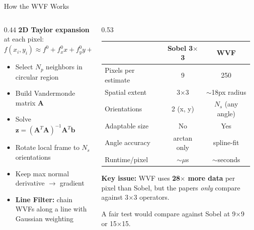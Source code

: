 \documentclass[10pt, aspectratio=169]{beamer}
\begin{document}
\begin{frame}{How the WVF Works}
  \begin{columns}[T]
    \begin{column}{0.44\textwidth}
      \textbf{2D Taylor expansion} at each pixel:
      \vspace{-0.3em}
      \begin{equation*}
        f(x_i, y_i) \approx f^0 + f_x^0 x + f_y^0 y + \tfrac{f_{xx}^0}{2} x^2 + \cdots
      \end{equation*}
      \vspace{-0.5em}
      \begin{itemize}
        \item Select $N_p$ neighbors in circular region
        \item Build Vandermonde matrix $\mathbf{A}$
        \item Solve $\mathbf{z} = (\mathbf{A}^T\mathbf{A})^{-1}\mathbf{A}^T\mathbf{b}$
        \item Rotate local frame to $N_s$ orientations
        \item Keep max normal derivative $\rightarrow$ gradient
        \item \textbf{Line Filter:} chain WVFs along a line with Gaussian weighting
      \end{itemize}
    \end{column}
    \begin{column}{0.53\textwidth}
      \vspace{0.5em}
      \begin{tabular}{lcc}
        \toprule
        & \textbf{Sobel 3$\times$3} & \textbf{WVF} \\
        \midrule
        Pixels per estimate & 9 & 250 \\
        Spatial extent & 3$\times$3 & $\sim$18px radius \\
        Orientations & 2 (x, y) & $N_s$ (any angle) \\
        Adaptable size & No & Yes \\
        Angle accuracy & arctan only & spline-fit \\
        Runtime/pixel & $\sim$$\mu$s & $\sim$seconds \\
        \bottomrule
      \end{tabular}
      \vspace{0.5em}

      \textbf{Key issue:} WVF uses \textbf{28$\times$ more data} per pixel than Sobel, but the papers \textit{only} compare against 3$\times$3 operators.

      \vspace{0.3em}
      {\small A fair test would compare against Sobel at 9$\times$9 or 15$\times$15.}
    \end{column}
  \end{columns}
\end{frame}
\end{document}
